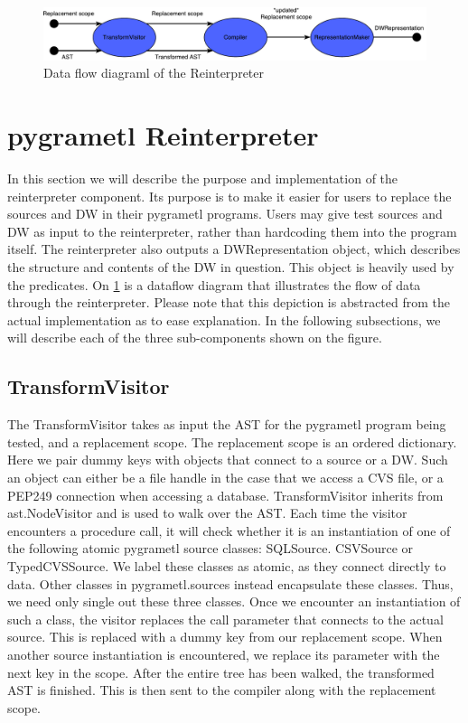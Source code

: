 \begin{figure}
  \centering
  \includegraphics[width=1\textwidth]{figures/reinterpreter.pdf}
  \caption{Data flow diagraml of the Reinterpreter}
  \label{fig:reinterpreter}
\end{figure}


\section{pygrametl Reinterpreter}
In this section we will describe the purpose and implementation of the reinterpreter component. Its purpose is to make it easier for users to replace the sources and DW in their pygrametl programs. Users may give test sources and DW as input to the reinterpreter, rather than hardcoding them into the program itself. The reinterpreter also outputs a DWRepresentation object, which describes the structure and contents of the DW in question. This object is heavily used by the predicates. On \cref{fig:reinterpreter} is a dataflow diagram that illustrates the flow of data through the reinterpreter. Please note that this depiction is abstracted from the actual implementation as to ease explanation. In the following subsections, we will describe each of the three sub-components shown on the figure.

\subsection{TransformVisitor}
The TransformVisitor takes as input the AST for the pygrametl program being tested, and a replacement scope. The replacement scope is an ordered dictionary. Here we pair dummy keys with objects that connect to  a source or a DW. Such an object can either be a file handle in the case that we access a CVS file, or a PEP249 connection when accessing a database.  TransformVisitor inherits from ast.NodeVisitor and is used to walk over the AST. Each time the visitor encounters a procedure call, it will check whether it is an instantiation of one of the following atomic pygrametl source classes: SQLSource. CSVSource or TypedCVSSource. We label these classes as atomic, as they connect directly to data. Other classes in pygrametl.sources instead encapsulate these classes. Thus, we need only single out these three classes. Once we encounter an instantiation of such a class, the visitor replaces the call parameter that connects to the actual source. This is replaced with a dummy key from our replacement scope.  When another source instantiation is encountered, we replace its parameter with the next key in the scope. After the entire tree has been walked, the transformed AST is finished. This is then sent to the compiler along with the replacement scope. 

